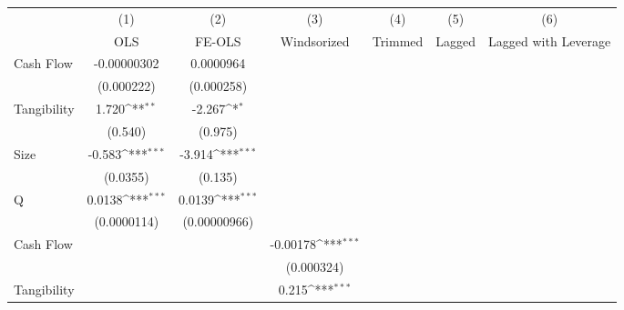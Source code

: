 {
\def\sym#1{\ifmmode^{#1}\else\(^{#1}\)\fi}
\begin{tabular}{l*{6}{c}}
\hline\hline
                    &\multicolumn{1}{c}{(1)}         &\multicolumn{1}{c}{(2)}         &\multicolumn{1}{c}{(3)}         &\multicolumn{1}{c}{(4)}         &\multicolumn{1}{c}{(5)}         &\multicolumn{1}{c}{(6)}         \\
                    &         OLS         &      FE-OLS         & Windsorized         &     Trimmed         &     Lagged          &Lagged with Leverage         \\
\hline
Cash Flow           & -0.00000302         &   0.0000964         &                     &                     &                     &                     \\
                    &  (0.000222)         &  (0.000258)         &                     &                     &                     &                     \\
[1em]
Tangibility         &       1.720\sym{**} &      -2.267\sym{*}  &                     &                     &                     &                     \\
                    &     (0.540)         &     (0.975)         &                     &                     &                     &                     \\
[1em]
Size                &      -0.583\sym{***}&      -3.914\sym{***}&                     &                     &                     &                     \\
                    &    (0.0355)         &     (0.135)         &                     &                     &                     &                     \\
[1em]
Q                   &      0.0138\sym{***}&      0.0139\sym{***}&                     &                     &                     &                     \\
                    & (0.0000114)         &(0.00000966)         &                     &                     &                     &                     \\
[1em]
Cash Flow           &                     &                     &    -0.00178\sym{***}&                     &                     &                     \\
                    &                     &                     &  (0.000324)         &                     &                     &                     \\
[1em]
Tangibility         &                     &                     &       0.215\sym{***}&                     &                     &                     \\

\end{tabular}}
